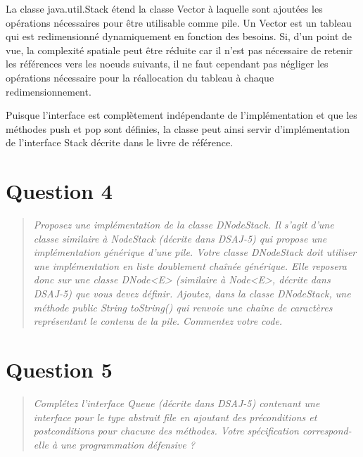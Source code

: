 \documentclass[11pt,a4paper]{article}
\begin{document}
La classe java.util.Stack étend la classe Vector à laquelle sont ajoutées les opérations nécessaires pour être utilisable comme pile. Un Vector est un tableau qui est redimensionné dynamiquement en fonction des besoins. Si, d'un point de vue, la complexité spatiale peut être réduite car il n'est pas nécessaire de retenir les références vers les noeuds suivants, il ne faut cependant pas négliger les opérations nécessaire pour la réallocation du tableau à chaque redimensionnement. 

Puisque l'interface est complètement indépendante de l'implémentation et que les méthodes push et pop sont définies, la classe peut ainsi servir d'implémentation de l'interface Stack décrite dans le livre de référence.

\section{Question 4}
\begin{quotation}
\textit{Proposez une implémentation de la classe DNodeStack. Il s’agit d’une classe
similaire à NodeStack (décrite dans DSAJ-5) qui propose une implémentation
générique d’une pile. Votre classe DNodeStack doit utiliser une implémentation en liste doublement chaînée générique. Elle reposera donc sur une classe
DNode<E> (similaire à Node<E>, décrite dans DSAJ-5) que vous devez définir.
Ajoutez, dans la classe DNodeStack, une méthode public String toString()
qui renvoie une chaîne de caractères représentant le contenu de la pile. Commentez votre code.}
\end{quotation}






\section{Question 5}
\begin{quotation}
\textit{Complétez l'interface Queue (décrite dans DSAJ-5) contenant une interface pour le type abstrait file en ajoutant des préconditions et postconditions pour chacune des méthodes. Votre spécification correspond-elle à une programmation défensive ?}
\end{quotation}



\end{document}
